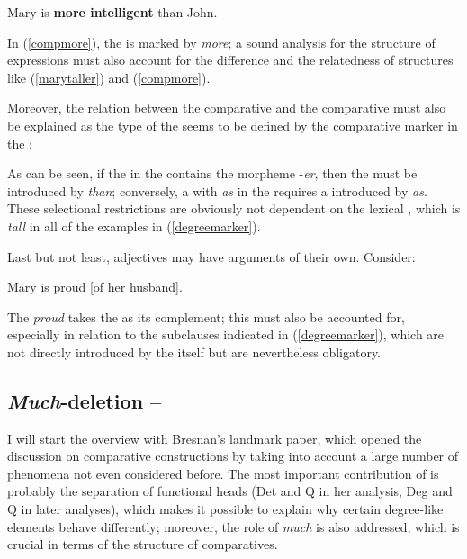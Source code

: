 \ea Mary is \textbf{more intelligent} than John.\label{compmore}
\z

In (\ref{compmore}), the  is marked by \textit{more}; a sound analysis for the structure of  expressions must also account for the difference and the relatedness of structures like (\ref{marytaller}) and (\ref{compmore}).

Moreover, the relation between the comparative  and the comparative  must also be explained as the type of the  seems to be defined by the comparative marker in the :

\ea \label{degreemarker}
\z
\z

As can be seen, if the  in the  contains the morpheme -\textit{er}, then the  must be introduced by \textit{than}; conversely, a  with \textit{as} in the  requires a  introduced by \textit{as}. These selectional restrictions are obviously not dependent on the lexical , which is \textit{tall} in all of the examples in (\ref{degreemarker}).

Last but not least, adjectives may have arguments of their own. Consider:

\ea Mary is proud [of her husband].\label{ppargument}
\z

The  \textit{proud} takes the  as its complement; this must also be accounted for, especially in relation to the subclauses indicated in (\ref{degreemarker}), which are not directly introduced by the  itself but are nevertheless obligatory.

\subsection{\textit{Much}-deletion -- \citet{bresnan1973}} \label{sec:2muchdeletion}
I will start the overview with Bresnan's landmark paper, which opened the discussion on comparative constructions by taking into account a large number of phenomena not even considered before. The most important contribution of \citet{bresnan1973} is probably the separation of functional heads (Det and Q in her analysis, Deg and Q in later analyses), which makes it possible to explain why certain degree-like elements behave differently; moreover, the role of \textit{much} is also addressed, which is crucial in terms of the structure of comparatives.


